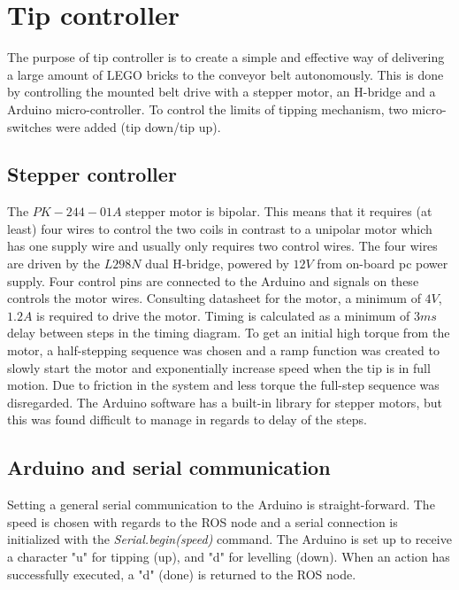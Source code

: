 \section{Tip controller} %
\label{sec:mr_tip_controller}

The purpose of tip controller is to create a simple and effective way of delivering a large amount of LEGO bricks to the conveyor belt autonomously. 
This is done by controlling the mounted belt drive with a stepper motor, an H-bridge and a Arduino micro-controller. To control the limits of tipping mechanism, two micro-switches were added (tip down/tip up).\\

\subsection{Stepper controller} %
\label{sub:stepper_controller}
The $PK-244-01A$ stepper motor is bipolar. This means that it requires (at least) four wires to control the two coils in contrast to a unipolar motor which has one supply wire and usually only requires two control wires. 
The four wires are driven by the $L298N$ dual H-bridge, powered by $12V$ from on-board pc power supply. Four control pins are connected to the Arduino and signals on these controls the motor wires. Consulting datasheet for the motor, a minimum of $4V$, $1.2A$ is required to drive the motor. Timing is calculated as a minimum of $3ms$ delay between steps in the timing diagram. To get an initial high torque from the motor, a half-stepping sequence was chosen and a ramp function was created to slowly start the motor and exponentially increase speed when the tip is in full motion. Due to friction in the system and less torque the full-step sequence was disregarded. The Arduino software has a built-in library 
for stepper motors, but this was found difficult to manage in regards to delay of the steps. 

\subsection{Arduino and serial communication} %
\label{sub:arduino_and_serial_communication}
Setting a general serial communication to the Arduino is straight-forward. The speed is chosen with regards to the ROS node and a serial connection is initialized with the \textit{Serial.begin(speed)} command. The Arduino is set 
up to receive a character "u" for tipping (up), and "d" for levelling (down). When an action has successfully executed, a "d" (done) is returned to the ROS node.


